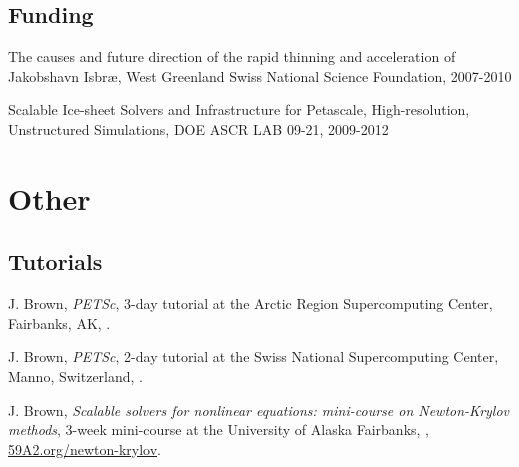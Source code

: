 \documentclass[10pt,letterpaper]{article}
\newcommand\ptitle[1]{\textit{#1}} %
\renewenvironment{itemize}{
  \begin{list}{}{
    \setlength{\leftmargin}{1.5em}
    \setlength{\itemsep}{0.25em}
    \setlength{\parskip}{0pt}
    \setlength{\parsep}{0.25em}
  }
}{
  \end{list}
}
\begin{document}
\subsection*{Funding}
\begin{itemize}
\item The causes and future direction of the rapid thinning and acceleration of Jakobshavn Isbr{\ae}, West Greenland Swiss National Science Foundation, 2007-2010
\item Scalable Ice-sheet Solvers and Infrastructure for Petascale, High-resolution, Unstructured Simulations, DOE ASCR LAB 09-21, 2009-2012
\end{itemize}

\section*{Other}
\subsection*{Tutorials}
\begin{itemize}
\item J. Brown, \ptitle{PETSc}, 3-day tutorial at the Arctic Region Supercomputing Center, Fairbanks, AK, .
\item J. Brown, \ptitle{PETSc}, 2-day tutorial at the Swiss National Supercomputing Center, Manno, Switzerland, .
\item J. Brown, \ptitle{Scalable solvers for nonlinear equations: mini-course on Newton-Krylov methods}, 3-week mini-course at the University of Alaska Fairbanks, , \href{http://59A2.org/newton-krylov/}{\url{59A2.org/newton-krylov}}.
\end{itemize}
\end{document}
